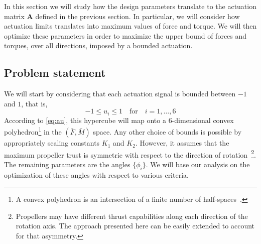 
In this section we will study how the design parameters translate to
the actuation matrix $\mathbf{A}$ defined in the previous section. In
particular, we will consider how actuation limits translates into
maximum values of force and torque. We will then optimize these
parameters in order to maximize the upper bound of forces and torques,
over all directions, imposed by a bounded actuation.

\subsection{Problem statement}
\label{sec:problem-statement}


We will start by considering that each actuation signal is
bounded between $-1$ and $1$, that is,
\begin{equation}
  \label{eq:ahcube}
  -1 \leq u_i \leq 1 \quad \text{for} \quad i=1,\ldots,6
\end{equation}
According to \eqref{eq:au}, this hypercube will map onto a
6-dimensional convex polyhedron\footnote{A convex polyhedron is an
  intersection of a finite number of half-spaces~\cite{jeter86}.} in
the $(\bar{F}, \bar{M})$ space.  Any other choice of bounds is
possible by appropriately scaling constants $K_1$ and $K_2$.  However,
it assumes that the maximum propeller trust is symmetric with respect
to the direction of rotation~\footnote{Propellers may have different
thrust capabilities along each direction of the rotation axis. The
approach presented here can be easily extended to account for that asymmetry.}.
The remaining parameters are the angles
$\{\phi_i\}$. We will base our analysis on the optimization of these
angles with respect to various criteria.

